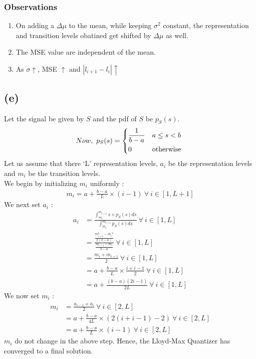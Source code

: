 \documentclass[a4paper,fleqn,11pt]{article}
\theoremstyle{mytheor}
\begin{document}
\subsubsection*{Observations}
\begin{enumerate}
\item On adding a $\Delta\mu$ to the mean, while keeping $\sigma^2$ constant, the representation and transition levels obatined get shifted by $\Delta\mu$ as well.
\item The MSE value are independent of the mean.
\item As $\sigma \uparrow$, MSE $\uparrow$ and $|l_{i + 1} - l_i| \uparrow$
\end{enumerate}

\subsection*{(e)}
Let the signal be given by $S$ and the pdf of $S$ be $p_S (s)$.
\begin{align*}
Now,\ p_S (s) = \begin{dcases*}
					\frac{1}{b - a}	& $a \leq s < b$\\
					0  				& otherwise
				\end{dcases*}
\end{align*}
Let us assume that there `L' representation levels, $a_i$ be the representation levels and $m_i$ be the transition levels. \\
We begin by initializing $m_i$ uniformly :
\begin{align*}
m_i = a + \frac{b - a}{L} \times (i - 1)\ \forall\ i \in [1, L + 1]
\end{align*}
We next set $a_i$ :
\begin{align*}
a_i &  = \frac{\int_{m_i}^{m_{i + 1}} s \times p_S (s) ds}{\int_{m_i}^{m_{i + 1}} p_S (s) ds}\ \forall\ i \in [1, L] \\
    & = \frac{\frac{m_{i + 1}^2 - {m_i}^2}{2(b - a)}}{\frac{m_{i + 1} - {m_i}}{b - a}}\ \forall\ i \in [1, L] \\
    & = \frac{m_i + m_{i + 1}}{2}\ \forall\ i \in [1, L] \\
    & = a + \frac{b - a}{L} \times \frac{i + i - 1}{2}\ \forall\ i \in [1, L] \\
    & = a + \frac{(b - a)(2i - 1)}{2L}\ \forall\ i \in [1, L]
\end{align*}
We now set $m_i$ :
\begin{align*}
m_i & = \frac{a_{i - 1} + a_i}{2}\ \forall\ i \in [2, L] \\
	& = a + \frac{b - a}{4L} \times (2 (i + i - 1) - 2)\ \forall\ i \in [2, L] \\
	& = a + \frac{b - a}{L} \times (i - 1)\ \forall\ i \in [2, L]
\end{align*}
$m_i$ do not change in the above step. Hence, the Lloyd-Max Quantizer has converged to a final solution.
\end{document}
